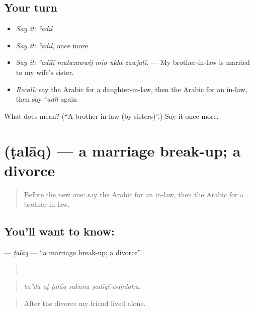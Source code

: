 \subsection*{Your turn}
\begin{itemize}
\raggedright
  \item \emph{Say it:} \emph{ʿadīl}
  \item \emph{Say it:} \emph{ʿadīl}, once more
  \item \emph{Say it:} \emph{ʿadīlī mutazawwij min ukht zawjatī.} — My brother-in-law is married to my wife's sister.
  \item \emph{Recall:} say the Arabic for a daughter-in-law, then the Arabic for an in-law, then say \emph{ʿadīl} again
\end{itemize}

\begin{tcolorbox}[breakable,colback=teal!4,colframe=teal!35!black,title={Before you move on}]
What does  mean? (\textquotedblleft{}A brother-in-law (by sisters)\textquotedblright{}.) Say it once more.
\end{tcolorbox}
\section[\texorpdfstring{\ar{طلاق} (ṭalāq)}{طلاق (ṭalāq)}]{ (ṭalāq) — a marriage break-up; a divorce}

\label{lesson:AR-C529-talaq}



\begin{quote}
Before the new one: say the Arabic for an in-law, then the Arabic for a brother-in-law.
\end{quote}

\subsection*{You'll want to know: }
\textbf{} — \emph{ṭalāq} — \textquotedblleft{}a marriage break-up; a divorce\textquotedblright{}.

\begin{quote}
    .
\end{quote}

\begin{quote}
\emph{baʿda aṭ-ṭalāq sakana ṣadīqī waḥdahu.}
\end{quote}

\begin{quote}
After the divorce my friend lived alone.
\end{quote}

